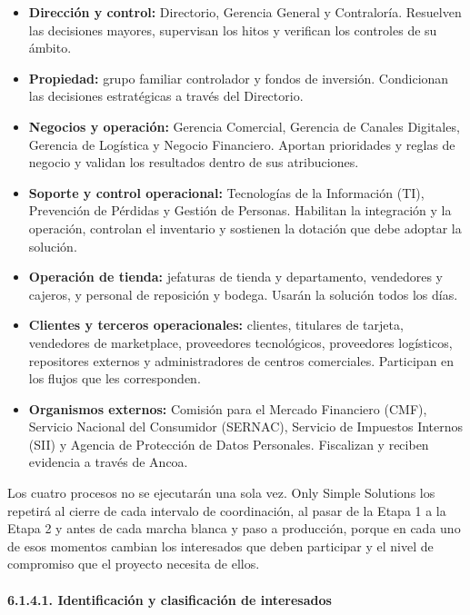 \documentclass[11pt]{article}
\begin{document}
\begin{itemize}
\item
  \textbf{Dirección y control:} Directorio, Gerencia General y
  Contraloría. Resuelven las decisiones mayores, supervisan los hitos y
  verifican los controles de su ámbito.
\item
  \textbf{Propiedad:} grupo familiar controlador y fondos de inversión.
  Condicionan las decisiones estratégicas a través del Directorio.
\item
  \textbf{Negocios y operación:} Gerencia Comercial, Gerencia de Canales
  Digitales, Gerencia de Logística y Negocio Financiero. Aportan
  prioridades y reglas de negocio y validan los resultados dentro de sus
  atribuciones.
\item
  \textbf{Soporte y control operacional:} Tecnologías de la Información
  (TI), Prevención de Pérdidas y Gestión de Personas. Habilitan la
  integración y la operación, controlan el inventario y sostienen la
  dotación que debe adoptar la solución.
\item
  \textbf{Operación de tienda:} jefaturas de tienda y departamento,
  vendedores y cajeros, y personal de reposición y bodega. Usarán la
  solución todos los días.
\item
  \textbf{Clientes y terceros operacionales:} clientes, titulares de
  tarjeta, vendedores de marketplace, proveedores tecnológicos,
  proveedores logísticos, repositores externos y administradores de
  centros comerciales. Participan en los flujos que les corresponden.
\item
  \textbf{Organismos externos:} Comisión para el Mercado Financiero
  (CMF), Servicio Nacional del Consumidor (SERNAC), Servicio de
  Impuestos Internos (SII) y Agencia de Protección de Datos Personales.
  Fiscalizan y reciben evidencia a través de Ancoa.
\end{itemize}

Los cuatro procesos no se ejecutarán una sola vez. Only Simple Solutions
los repetirá al cierre de cada intervalo de coordinación, al pasar de la
Etapa 1 a la Etapa 2 y antes de cada marcha blanca y paso a producción,
porque en cada uno de esos momentos cambian los interesados que deben
participar y el nivel de compromiso que el proyecto necesita de ellos.

\paragraph{6.1.4.1. Identificación y clasificación de interesados}\label{6-1-4-1-identificacion-y-clasificacion-de-interesados}
\end{document}
